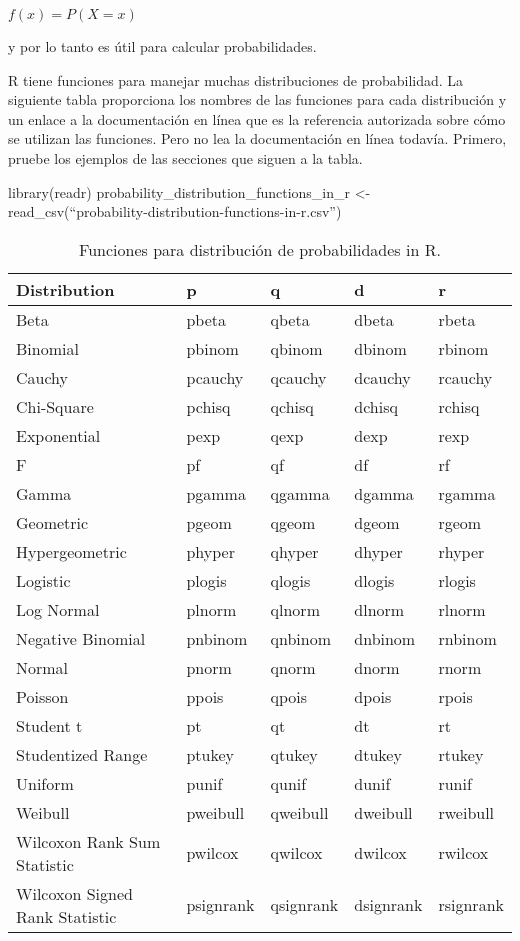 \documentclass[
]{book}
\begin{document}
\(f(x) = P(X = x)\)

y por lo tanto es útil para calcular probabilidades.

R tiene funciones para manejar muchas distribuciones de probabilidad. La siguiente tabla proporciona los nombres de las funciones para cada distribución y un enlace a la documentación en línea que es la referencia autorizada sobre cómo se utilizan las funciones. Pero no lea la documentación en línea todavía. Primero, pruebe los ejemplos de las secciones que siguen a la tabla.

library(readr)
probability\_distribution\_functions\_in\_r \textless- read\_csv(``probability-distribution-functions-in-r.csv'')

\begin{table}[!h]

\caption{\label{tab:table-probability-functions}Funciones para distribución de probabilidades in R.}
\centering
\fontsize{12}{14}\selectfont
\begin{tabular}[t]{>{\raggedright\arraybackslash}p{0.5in}>{\raggedright\arraybackslash}p{0.7in}>{\raggedright\arraybackslash}p{1in}>{\raggedright\arraybackslash}p{1.1in}>{\raggedright\arraybackslash}p{1in}}
\toprule
Distribution & p & q & d & r\\
\midrule
Beta & pbeta & qbeta & dbeta & rbeta\\
Binomial & pbinom & qbinom & dbinom & rbinom\\
Cauchy & pcauchy & qcauchy & dcauchy & rcauchy\\
Chi-Square & pchisq & qchisq & dchisq & rchisq\\
Exponential & pexp & qexp & dexp & rexp\\
F & pf & qf & df & rf\\
Gamma & pgamma & qgamma & dgamma & rgamma\\
Geometric & pgeom & qgeom & dgeom & rgeom\\
Hypergeometric & phyper & qhyper & dhyper & rhyper\\
Logistic & plogis & qlogis & dlogis & rlogis\\
Log Normal & plnorm & qlnorm & dlnorm & rlnorm\\
Negative Binomial & pnbinom & qnbinom & dnbinom & rnbinom\\
Normal & pnorm & qnorm & dnorm & rnorm\\
Poisson & ppois & qpois & dpois & rpois\\
Student t & pt & qt & dt & rt\\
Studentized Range & ptukey & qtukey & dtukey & rtukey\\
Uniform & punif & qunif & dunif & runif\\
Weibull & pweibull & qweibull & dweibull & rweibull\\
Wilcoxon Rank Sum Statistic & pwilcox & qwilcox & dwilcox & rwilcox\\
Wilcoxon Signed Rank Statistic & psignrank & qsignrank & dsignrank & rsignrank\\
\bottomrule
\end{tabular}
\end{table}
\end{document}
